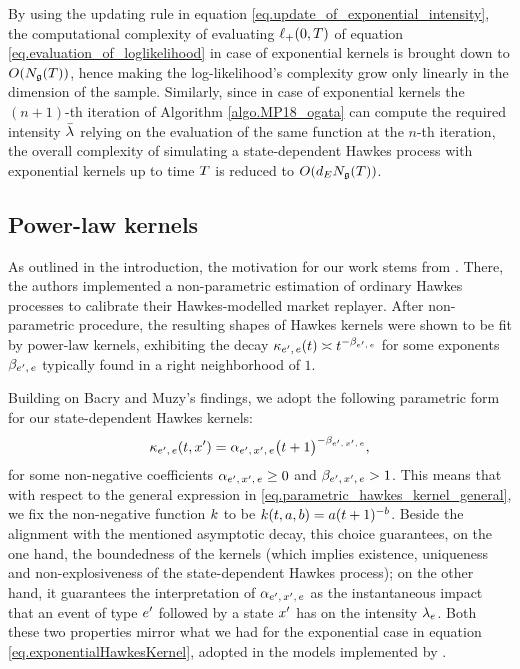\documentclass[10pt, article,table]{article}
\begin{document}
By using the updating rule in equation \eqref{eq.update_of_exponential_intensity}, the computational complexity of evaluating $\lplus(0,T)$ of equation \eqref{eq.evaluation_of_loglikelihood} in case of exponential kernels is brought down to $O(\groundProc(T))$, hence making the log-likelihood's complexity grow only linearly in the dimension of the sample. 
Similarly, since in case of exponential kernels the $(n+1)$-th iteration of Algorithm \ref{algo.MP18_ogata} can compute the required intensity $\bar{\intensity[]}$ relying on the evaluation of the same function at the $n$-th iteration, the overall complexity of simulating a state-dependent Hawkes process with exponential kernels up to time $\timeHorizon$ is reduced to $O(\numEventTypes\groundProc(\timeHorizon))$.

\subsection{Power-law kernels}\label{sec.powerlaw_kernels}
As outlined in the introduction, the motivation for our work stems from  \citealp{BM14haw}. There, the authors implemented a non-parametric estimation of ordinary Hawkes processes to calibrate their Hawkes-modelled market replayer. After non-parametric procedure, the resulting shapes of Hawkes kernels were shown to be fit by power-law kernels, exhibiting the decay $\hawkesKernel\subscriptee(t) \asymp t^{-\decCoef\subscriptee}$ for some exponents $\decCoef\subscriptee$ typically found in a right neighborhood of $1$.

Building on Bacry and Muzy's findings, we adopt the following parametric form for our state-dependent Hawkes kernels:
\begin{equation}\label{eq.powerlaw_kernels}
 \hawkesKernel\subscriptee(t,\xone) 
 = \impCoef\subscriptexe \big( t+ 1 \big)^{-\decCoef\subscriptexe},
\end{equation}
for some non-negative coefficients $\impCoef\subscriptexe \geq 0$ and $\decCoef\subscriptexe > 1$. 
This means that with respect to the general expression in \eqref{eq.parametric_hawkes_kernel_general}, we fix the non-negative function $\parametricHawkesKernel$ to be $\parametricHawkesKernel(t,a,b) = a(t+1)^{-b}$.  
Beside the alignment with the mentioned asymptotic decay, this choice guarantees, on the one hand, the boundedness of the kernels (which implies existence, uniqueness and non-explosiveness of the state-dependent Hawkes process); on the other hand, it guarantees the interpretation of $\impCoef\subscriptexe$ as the instantaneous impact  that an event of type $\eone$ followed by a state $\xone$ has on the intensity $\intensity[e]$. Both these two properties mirror what we had for the exponential case in equation \eqref{eq.exponentialHawkesKernel}, adopted in the models implemented by \citealp{MP18sta}.
\end{document}
